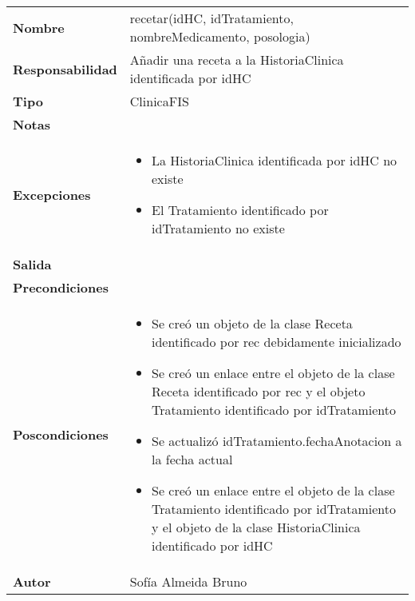 \documentclass[11pt,a4paper]{article}
\begin{document}
\begin{table}[H]
\centering
\label{my-label}
\begin{tabularx}{\textwidth}{l|X}
\textbf{Nombre}          & recetar(idHC, idTratamiento, nombreMedicamento, posologia) \\
\textbf{Responsabilidad} & Añadir una receta a la HistoriaClinica identificada por idHC\\
\textbf{Tipo}            & ClinicaFIS \\
\textbf{Notas}           &  \\
\textbf{Excepciones}     & 
\begin{itemize}
\item La HistoriaClinica identificada por idHC no existe
\item El Tratamiento identificado por idTratamiento no existe
\end{itemize}\\
\textbf{Salida}          &  \\
\textbf{Precondiciones}  &  \\
\textbf{Poscondiciones}  &
\begin{itemize}
\item Se creó un objeto de la clase Receta identificado por rec debidamente inicializado
\item Se creó un enlace entre el objeto de la clase Receta identificado por rec y el objeto Tratamiento identificado por idTratamiento
\item Se actualizó idTratamiento.fechaAnotacion a la fecha actual
\item Se creó un enlace entre el objeto de la clase Tratamiento identificado por idTratamiento y el objeto de la clase HistoriaClinica identificado por idHC
\end{itemize}\\
\textbf{Autor}           & Sofía Almeida Bruno
\end{tabularx}
\end{table}
\end{document}
